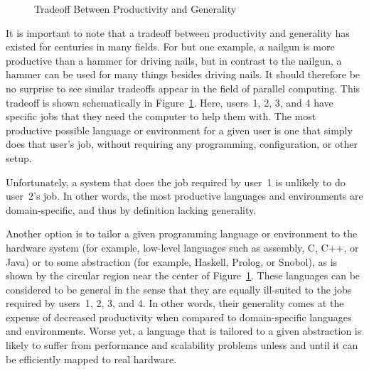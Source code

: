\begin{figure}
\centering
{}
\caption{Tradeoff Between Productivity and Generality}
\label{fig:intro:Tradeoff Between Productivity and Generality}
\end{figure}

It is important to note that a tradeoff between productivity and
generality has existed for centuries in many fields.
For but one example, a nailgun is more productive than a hammer for
driving nails, but in contrast to the nailgun, a hammer can be used for
many things besides driving nails.
It should therefore be no surprise to see similar tradeoffs
appear in the field of parallel computing.
This tradeoff is shown schematically in
Figure~\ref{fig:intro:Tradeoff Between Productivity and Generality}.
Here, users~1, 2, 3, and 4 have specific jobs that they need the computer
to help them with.
The most productive possible language or environment for a given user is one
that simply does that user's job, without requiring any programming,
configuration, or other setup.

\QuickQuizEnd

Unfortunately, a system that does the job required by user~1 is
unlikely to do user~2's job.
In other words, the most productive languages and environments are
domain-specific, and thus by definition lacking generality.

Another option is to tailor a given programming language or environment
to the hardware system (for example, low-level languages such as
assembly, C, C++, or Java) or to some abstraction (for example,
Haskell, Prolog, or Snobol), as is shown by the circular region near
the center of
Figure~\ref{fig:intro:Tradeoff Between Productivity and Generality}.
These languages can be considered to be general in the sense that they
are equally ill-suited to the jobs required by users~1, 2, 3, and 4.
In other words, their generality comes at the expense of
decreased productivity when compared to domain-specific languages
and environments.
Worse yet, a language that is tailored to a given abstraction
is likely to suffer from performance and scalability problems
unless and until it can be efficiently mapped to real hardware.


